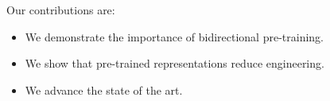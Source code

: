 Our contributions are:
\begin{itemize}
\item We demonstrate the importance of bidirectional pre-training.
\item We show that pre-trained representations reduce engineering.
\item We advance the state of the art.
\end{itemize}
